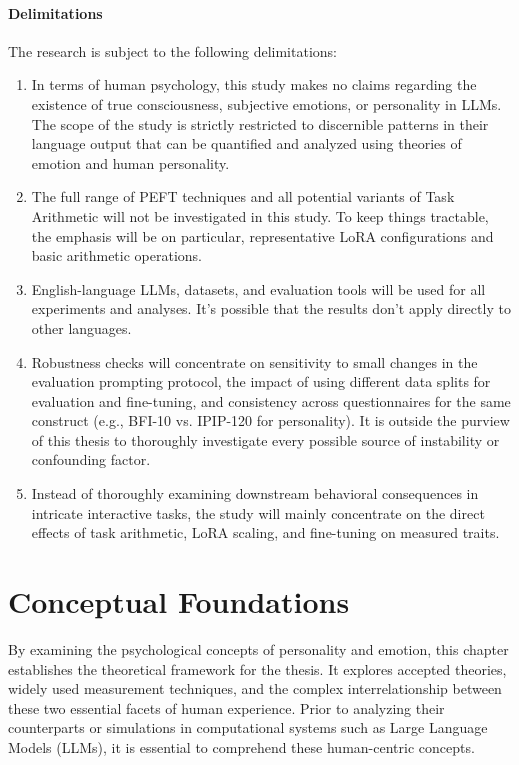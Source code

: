 \documentclass{DESSThesis}
\begin{document}
\subsubsection{Delimitations}
The research is subject to the following delimitations:
\begin{enumerate}
\item In terms of human psychology, this study makes no claims regarding the existence of true consciousness, subjective emotions, or personality in LLMs. The scope of the study is strictly restricted to discernible patterns in their language output that can be quantified and analyzed using theories of emotion and human personality.
\item The full range of PEFT techniques and all potential variants of Task Arithmetic will not be investigated in this study. To keep things tractable, the emphasis will be on particular, representative LoRA configurations and basic arithmetic operations.
\item English-language LLMs, datasets, and evaluation tools will be used for all experiments and analyses. It's possible that the results don't apply directly to other languages.
\item Robustness checks will concentrate on sensitivity to small changes in the evaluation prompting protocol, the impact of using different data splits for evaluation and fine-tuning, and consistency across questionnaires for the same construct (e.g., BFI-10 vs. IPIP-120 for personality). It is outside the purview of this thesis to thoroughly investigate every possible source of instability or confounding factor.
\item Instead of thoroughly examining downstream behavioral consequences in intricate interactive tasks, the study will mainly concentrate on the direct effects of task arithmetic, LoRA scaling, and fine-tuning on measured traits.
\end{enumerate}



\chapter{Conceptual Foundations}
\thispagestyle{empty}

By examining the psychological concepts of personality and emotion, this chapter establishes the theoretical framework for the thesis. It explores accepted theories, widely used measurement techniques, and the complex interrelationship between these two essential facets of human experience. Prior to analyzing their counterparts or simulations in computational systems such as Large Language Models (LLMs), it is essential to comprehend these human-centric concepts.
\end{document}
